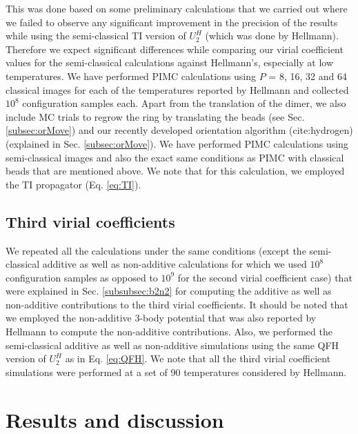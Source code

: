         This was done based on some preliminary calculations that we carried out where we failed to observe any significant improvement in the precision of the results while using the semi-classical TI version of $U_2^H$ (which was done by Hellmann). Therefore we expect significant differences while comparing our virial coefficient values for the semi-classical calculations against Hellmann's, especially at low temperatures. We have performed PIMC calculations using $P$ = 8, 16, 32 and 64 classical images for each of the temperatures reported by Hellmann and collected $10^8$ configuration samples each. Apart from the translation of the dimer, we also include MC trials to regrow the ring by translating the beads (see Sec. \ref{subsec:orMove}) and our recently developed orientation algorithm (cite:hydrogen) (explained in Sec. \ref{subsec:orMove}). We have performed PIMC calculations using semi-classical images and also the exact same conditions as PIMC with classical beads that are mentioned above. We note that for this calculation, we employed the TI propagator (Eq. \eqref{eq:TI}).

    \subsection{Third virial coefficients}
        We repeated all the calculations under the same conditions (except the semi-classical additive as well as non-additive calculations for which we used $10^8$ configuration samples as opposed to $10^9$ for the second virial coefficient case) that were explained in Sec. \ref{subsubsec:b2n2} for computing the additive as well as non-additive contributions to the third virial coefficients. It should be noted that we employed the non-additive 3-body potential that was also reported by Hellmann \cite{Hellmann2013} to compute the non-additive contributions. Also, we performed the semi-classical additive as well as non-additive simulations using the same QFH version of $U_2^H$ as in Eq. \eqref{eq:QFH}. We note that all the third virial coefficient simulations were performed at a set of 90 temperatures considered by Hellmann.
\section{Results and discussion}
